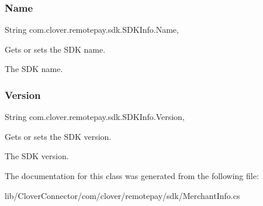 \subsubsection{\texorpdfstring{Name}{Name}}
{\footnotesize\ttfamily String com.\+clover.\+remotepay.\+sdk.\+S\+D\+K\+Info.\+Name\hspace{0.3cm}{\ttfamily [get]}, {\ttfamily [set]}}



Gets or sets the S\+DK name. 

The S\+DK name. \mbox{\label{classcom_1_1clover_1_1remotepay_1_1sdk_1_1_s_d_k_info_a48f760a4186c72115f1e00bc4446ce09}} 
\subsubsection{\texorpdfstring{Version}{Version}}
{\footnotesize\ttfamily String com.\+clover.\+remotepay.\+sdk.\+S\+D\+K\+Info.\+Version\hspace{0.3cm}{\ttfamily [get]}, {\ttfamily [set]}}



Gets or sets the S\+DK version. 

The S\+DK version. 

The documentation for this class was generated from the following file\+:\begin{DoxyCompactItemize}
\item 
lib/\+Clover\+Connector/com/clover/remotepay/sdk/Merchant\+Info.\+cs\end{DoxyCompactItemize}
